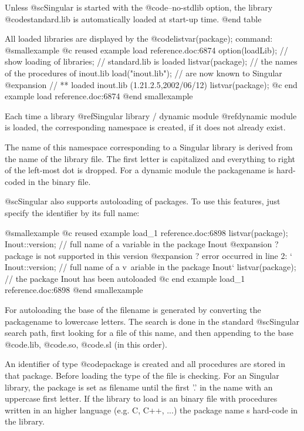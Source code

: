{{{{{{{{Unless  @sc{Singular} is started with the @code{--no-stdlib} option, the
library @code{standard.lib} is automatically loaded at start-up time.
@end table

All loaded libraries are displayed by the @code{listvar(package);}
command:
@smallexample
@c reused example load reference.doc:6874 
  option(loadLib);   // show loading of libraries;
                     // standard.lib is loaded
  listvar(package);
                     // the names of the procedures of inout.lib
  load("inout.lib"); // are now known to Singular
@expansion{} // ** loaded inout.lib (1.21.2.5,2002/06/12)
  listvar(package);
@c end example load reference.doc:6874
@end smallexample

Each time a library @ref{Singular library} / dynamic module @ref{dynamic
module} is loaded, the corresponding namespace is created, if it does
not already exist.

The name of this namespace corresponding to a Singular library is
derived from the name of the library file. The first letter is
capitalized and everything to right of the left-most dot is
dropped.
For a dynamic module the packagename is hard-coded in the binary file.

@sc{Singular} also supports autoloading of packages.
To use this features, just specify the identifier by its full name:

@smallexample
@c reused example load_1 reference.doc:6898 
  listvar(package);
  Inout::version;     // full name of a variable in the package Inout
@expansion{}    ? package is not supported in this version
@expansion{}    ? error occurred in line 2: `  Inout::version;     // full name of a v\
   ariable in the package Inout`
  listvar(package);   // the package Inout has been autoloaded
@c end example load_1 reference.doc:6898
@end smallexample

For autoloading the base of the filename is generated by converting the
packagename to lowercase letters. The search is done in the standard
@sc{Singular} search path, first looking for a file of this name, and then
appending to the base @code{.lib}, @code{.so}, @code{.sl} (in this order).


An identifier of type @code{package} is created and all procedures are
stored in that package.
Before loading the type of the file is checking. For an Singular
library, the package is set as filename until the first '.' in the name
with an uppercase first letter. If the library to load is an binary file
with procedures written in an higher language (e.g. C, C++, ...) the
package name s hard-code in the library.


}}}}}}}}
